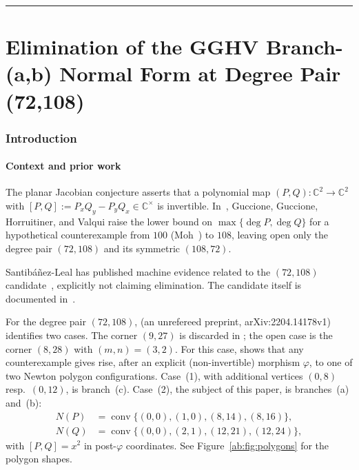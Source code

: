 \documentclass[a4paper,11pt]{article}
\theoremstyle{plain}
\theoremstyle{definition}
\theoremstyle{remark}
\begin{document}
\vspace{1.2cm}
\hrule
\vspace{1.4cm}

\tableofcontents
\newpage

\part{\texorpdfstring{Elimination of the GGHV Branch-(a,b) Normal Form at Degree Pair (72,108)}{Elimination of the GGHV Branch-(a,b) Normal Form at Degree Pair (72,108)}}

\section{Introduction}

\subsection{Context and prior work}

The planar Jacobian conjecture asserts that a polynomial map $(P,Q):\mathbb{C}^2\to\mathbb{C}^2$ with $[P,Q]:=P_xQ_y-P_yQ_x\in\mathbb{C}^\times$ is invertible. In~\cite{GGHV}, Guccione, Guccione, Horruitiner, and Valqui raise the lower bound on $\max\{\deg P,\deg Q\}$ for a hypothetical counterexample from $100$ (Moh~\cite{Moh}) to $108$, leaving open only the degree pair $(72,108)$ and its symmetric $(108,72)$.

Santib\'a\~nez-Leal has published machine evidence related to the $(72,108)$ candidate~\cite{Santibanez,SantibanezPaper}, explicitly not claiming elimination. The candidate itself is documented in~\cite{JC125note}.

For the degree pair $(72,108)$, \cite{GGHV} (an unrefereed preprint, arXiv:2204.14178v1) identifies two cases. The corner $(9,27)$ is discarded in \cite[\S5]{GGHV}; the open case is the corner $(8,28)$ with $(m,n)=(3,2)$. For this case, \cite[Proposition~4.3]{GGHV} shows that any counterexample gives rise, after an explicit (non-invertible) morphism $\varphi$, to one of two Newton polygon configurations. Case~(1), with additional vertices $(0,8)$ resp.\ $(0,12)$, is branch~(c). Case~(2), the subject of this paper, is branches~(a) and~(b):
\begin{equation}\label{ab:eq:polygons}
\begin{aligned}
N(P)&=\operatorname{conv}\{(0,0),(1,0),(8,14),(8,16)\},\\
N(Q)&=\operatorname{conv}\{(0,0),(2,1),(12,21),(12,24)\},
\end{aligned}
\end{equation}
with $[P,Q]=x^2$ in post-$\varphi$ coordinates. See Figure~\ref{ab:fig:polygons} for the polygon shapes.
\end{document}
